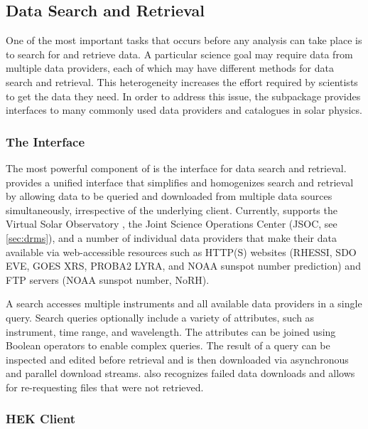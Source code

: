 
\subsection{Data Search and Retrieval}
\label{sec:fido}

One of the most important tasks that occurs before any analysis can take place is to search for and retrieve data.
A particular science goal may require data from multiple data providers, each of which may have different methods for data search and retrieval.
This heterogeneity increases the effort required by scientists to get the data they need.
In order to address this issue, the  subpackage provides interfaces to many commonly used data providers and catalogues in solar physics.

\subsubsection{The \Fido Interface}
\label{sec:fido}

The most powerful component of  is the \Fido interface for data search and retrieval.
\Fido provides a unified interface that simplifies and homogenizes search and retrieval by allowing data to be queried and downloaded from multiple data sources simultaneously, irrespective of the underlying client.
Currently, \Fido supports the Virtual Solar Observatory \citep[VSO,][]{2009EM&P..104..315H}, the Joint Science Operations Center (JSOC, see \autoref{sec:drms}), and a number of individual data providers that make their data available via web-accessible resources such as HTTP(S) websites (RHESSI, SDO EVE, GOES XRS, PROBA2 LYRA, and NOAA sunspot number prediction) and FTP servers (NOAA sunspot number, NoRH).

A \Fido search accesses multiple instruments and all available data providers in a single query.
Search queries optionally include a variety of attributes, such as instrument, time range, and wavelength.
The attributes can be joined using Boolean operators to enable complex queries.
The result of a \Fido query can be inspected and edited before retrieval and is then downloaded via asynchronous and parallel download streams.
\Fido also recognizes failed data downloads and allows for re-requesting files that were not retrieved.

\subsubsection{HEK Client}
\label{sec:hek}

